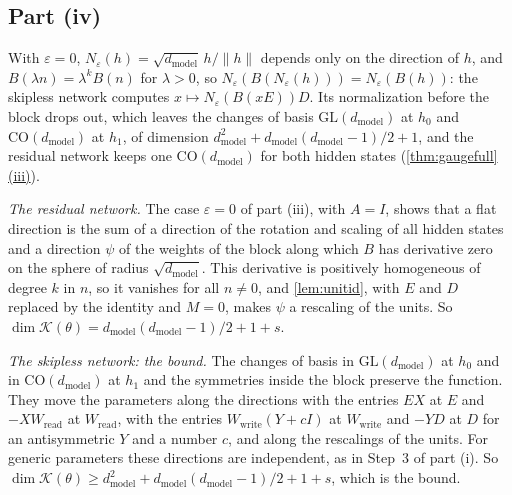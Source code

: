 \documentclass[10pt]{article}
\theoremstyle{definition}
\theoremstyle{remark}
\newcommand{\Wread}{W_{\mathrm{read}}}
\newcommand{\Wwrite}{W_{\mathrm{write}}}
\newcommand{\dm}{d_{\mathrm{model}}}
\newcommand{\GL}{\mathrm{GL}}
\newcommand{\CO}{\mathrm{CO}}
\newcommand{\norm}[1]{\lVert #1\rVert}
\DeclareRobustCommand{\cpref}[2]{\hyperref[#1:#2]{\cref*{#1}(#2)}}
\begin{document}
\subsection*{Part (iv)}

With $\varepsilon = 0$, $N_\varepsilon(h) = \sqrt{\dm}\,h/\norm{h}$ depends only on the direction of $h$, and $B(\lambda n) = \lambda^kB(n)$ for $\lambda > 0$, so $N_\varepsilon(B(N_\varepsilon(h))) = N_\varepsilon(B(h))$: the skipless network computes $x \mapsto N_\varepsilon(B(xE))D$. Its normalization before the block drops out, which leaves the changes of basis $\GL(\dm)$ at $h_0$ and $\CO(\dm)$ at $h_1$, of dimension $\dm^2 + \dm(\dm-1)/2 + 1$, and the residual network keeps one $\CO(\dm)$ for both hidden states (\cpref{thm:gaugefull}{iii}).

\emph{The residual network.} The case $\varepsilon = 0$ of part (iii), with $A = I$, shows that a flat direction is the sum of a direction of the rotation and scaling of all hidden states and a direction $\psi$ of the weights of the block along which $B$ has derivative zero on the sphere of radius $\sqrt{\dm}$. This derivative is positively homogeneous of degree $k$ in $n$, so it vanishes for all $n \neq 0$, and \cref{lem:unitid}, with $E$ and $D$ replaced by the identity and $M = 0$, makes $\psi$ a rescaling of the units. So $\dim\mathcal K(\theta) = \dm(\dm-1)/2 + 1 + s$.

\emph{The skipless network: the bound.} The changes of basis in $\GL(\dm)$ at $h_0$ and in $\CO(\dm)$ at $h_1$ and the symmetries inside the block preserve the function. They move the parameters along the directions with the entries $EX$ at $E$ and $-X\Wread$ at $\Wread$, with the entries $\Wwrite(Y + cI)$ at $\Wwrite$ and $-YD$ at $D$ for an antisymmetric $Y$ and a number $c$, and along the rescalings of the units. For generic parameters these directions are independent, as in Step~3 of part (i). So $\dim\mathcal K(\theta) \ge \dm^2 + \dm(\dm-1)/2 + 1 + s$, which is the bound.
\end{document}

